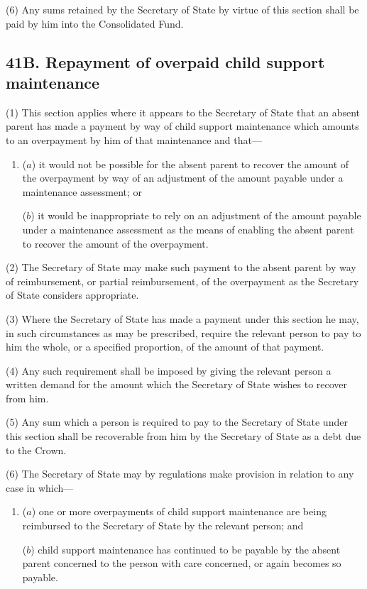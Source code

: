 \documentclass[12pt,a4paper]{article}
\begin{document}
(6) Any sums retained by the Secretary of State by virtue of this section shall be paid by him into the Consolidated Fund.


\subsection{41B. Repayment of overpaid child support maintenance}

(1) This section applies where it appears to the Secretary of State that an absent parent has made a payment by way of child support maintenance which amounts to an overpayment by him of that maintenance and that—
\begin{enumerate}\item[]
($a$) it would not be possible for the absent parent to recover the amount of the overpayment by way of an adjustment of the amount payable under a maintenance assessment; or

($b$) it would be inappropriate to rely on an adjustment of the amount payable under a maintenance assessment as the means of enabling the absent parent to recover the amount of the overpayment.
\end{enumerate}

(2) The Secretary of State may make such payment to the absent parent by way of reimbursement, or partial reimbursement, of the overpayment as the Secretary of State considers appropriate.

(3) Where the Secretary of State has made a payment under this section he may, in such circumstances as may be prescribed, require the relevant person to pay to him the whole, or a specified proportion, of the amount of that payment.

(4) Any such requirement shall be imposed by giving the relevant person a written demand for the amount which the Secretary of State wishes to recover from him.

(5) Any sum which a person is required to pay to the Secretary of State under this section shall be recoverable from him by the Secretary of State as a debt due to the Crown.

(6) The Secretary of State may by regulations make provision in relation to any case in which—
\begin{enumerate}\item[]
($a$) one or more overpayments of child support maintenance are being reimbursed to the Secretary of State by the relevant person; and

($b$) child support maintenance has continued to be payable by the absent parent concerned to the person with care concerned, or again becomes so payable.
\end{enumerate}
\end{document}
